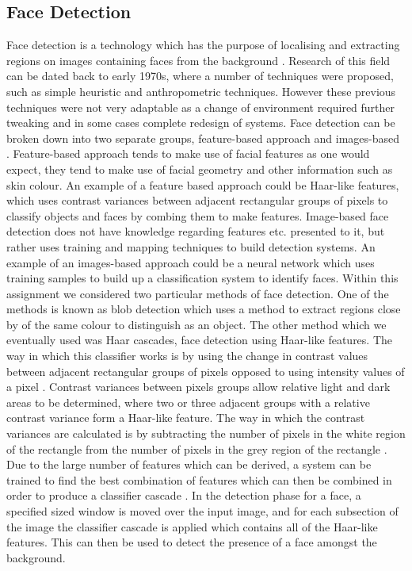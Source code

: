 \documentclass[conference]{IEEEtran}
\begin{document}
\subsection{Face Detection}
Face detection is a technology which has the purpose of localising and extracting regions on images containing faces from the background \cite{hjelmaas2001face}.
Research of this field can be dated back to early 1970s, where a number of techniques were proposed, such as simple heuristic and anthropometric techniques\cite{hjelmaas2001face}. However these previous techniques were not very adaptable as a change of environment required further tweaking and in some cases complete redesign of systems.
Face detection can be broken down into two separate groups, feature-based approach and images-based \cite{hjelmaas2001face}. Feature-based approach tends to make use of facial features as one would expect, they tend to make use of facial geometry and other information such as skin colour. An example of a feature based approach could be Haar-like features, which uses contrast variances between adjacent rectangular groups of pixels to classify objects and faces by combing them to make features. Image-based face detection does not have knowledge regarding features etc. presented to it, but rather uses training and mapping techniques to build detection systems. An example of an images-based approach could be a neural network which uses training samples to build up a classification system to identify faces.
Within this assignment we considered two particular methods of face detection. One of the methods is known as blob detection which uses a method to extract regions close by of the same colour to distinguish as an object. The other method which we eventually used was Haar cascades, face detection using Haar-like features. The way in which this classifier works is by using the change in contrast values between adjacent rectangular groups of pixels opposed to using intensity values of a pixel \cite{wilson2006facial}. Contrast variances between pixels groups allow relative light and dark areas to be determined, where two or three adjacent groups with a relative contrast variance form a Haar-like feature. The way in which the contrast variances are calculated is by subtracting the number of pixels in the white region of the rectangle from the number of pixels in the grey region of the rectangle \cite{viola2004robust}. Due to the large number of features which can be derived, a system can be trained to find the best combination of features which can then be combined in order to produce a classifier cascade \cite{viola2004robust}. In the detection phase for a face, a specified sized window is moved over the input image, and for each subsection of the image the classifier cascade is applied which contains all of the Haar-like features. This can then be used to detect the presence of a face amongst the background.
\end{document}

